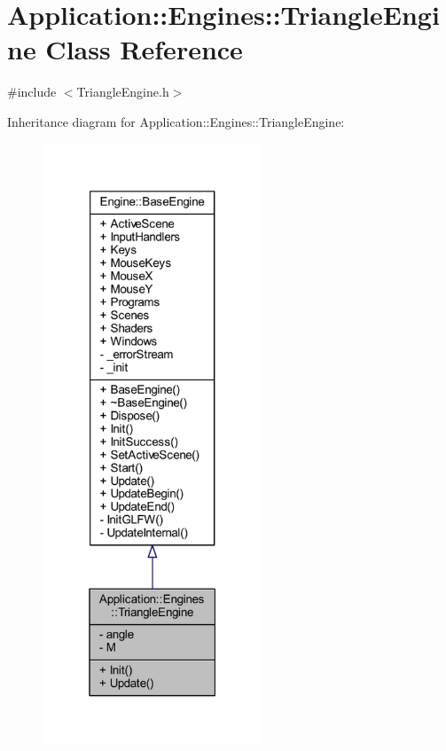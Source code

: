 \hypertarget{classApplication_1_1Engines_1_1TriangleEngine}{}\section{Application\+:\+:Engines\+:\+:Triangle\+Engine Class Reference}
\label{classApplication_1_1Engines_1_1TriangleEngine}


{\ttfamily \#include $<$Triangle\+Engine.\+h$>$}



Inheritance diagram for Application\+:\+:Engines\+:\+:Triangle\+Engine\+:
\nopagebreak
\begin{figure}[H]
\begin{center}
\leavevmode
\includegraphics[width=186pt]{classApplication_1_1Engines_1_1TriangleEngine__inherit__graph}
\end{center}
\end{figure}


